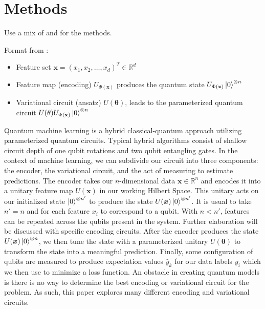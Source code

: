 \documentclass[journal=jacsat,manuscript=article]{achemso}
\newcommand{\R}{\mathbb{R}}
\begin{document}
\section{Methods}
Use a mix of  \cite{hatakeyama-sato_quantum_2023} and \cite{suzuki_predicting_2020} for the methods.

Format from \cite{suzuki_predicting_2020}:
\begin{itemize}
	\item Feature set $\mathbf{x}=(x_{1}, x_{2}, \ldots, x_{d})^{T} \in \mathbb{R}^{d}$
	\item Feature map (encoding) $U_{\Phi(\mathbf{x})}$ produces the quantum state $U_{\Phi(\mathbf{x})}\ket{0}^{\otimes n}$
	\item Variational circuit (ansatz) $U(\mathbf{\theta})$, leads to the parameterized quantum circuit $U(\mathbf{\theta})U_{\Phi(\mathbf{x})}\ket{0}^{\otimes n}$
\end{itemize}




Quantum machine learning is a hybrid classical-quantum approach utilizing parameterized quantum circuits. Typical hybrid algorithms consist of shallow circuit depth of one qubit rotations and two qubit entangling gates. In the context of machine learning, we can subdivide our circuit into three components: the encoder, the variational circuit, and the act of measuring to estimate predictions. The encoder takes our $n$-dimensional data $\bm x \in \R^n$ and encodes it into a unitary feature map $U(\bm x)$ in our working Hilbert Space. This unitary acts on our initialized state $\ket{0}^{\otimes n'}$ to produce the state $U(\bm x) \ket{0}^{\otimes n'}$. It is usual to take $n' = n$ and for each feature $x_i$ to correspond to a qubit. With $n < n'$, features can be repeated across the qubits present in the system. Further elaboration will be discussed with specific encoding circuits. After the encoder produces the state $U(\bm x)\ket{0}^{\otimes n}$, we then tune the state with a parameterized unitary $U(\bm \theta)$ to transform the state into a meaningful prediction. Finally, some configuration of qubits are measured to produce expectation values $\hat y_k$ for our data labels $y_i$ which we then use to minimize a loss function. An obstacle in creating quantum models is there is no way to determine the best encoding or variational circuit for the problem. As such, this paper explores many different encoding and variational circuits. \par
\end{document}
